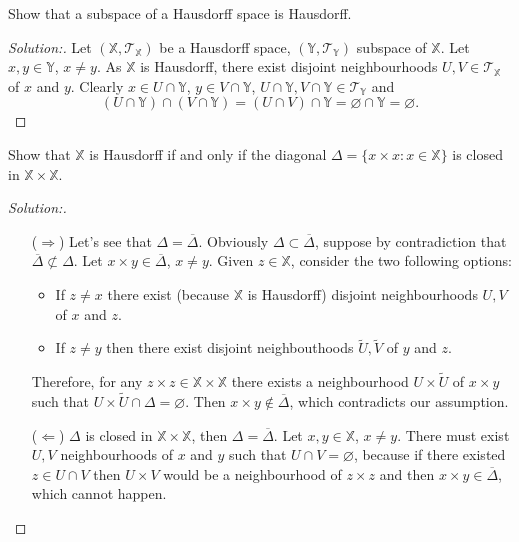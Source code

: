 \documentclass[a4paper,12pt, reqno]{article}
\theoremstyle{definition}
\newenvironment{exerr}[1]{
  \renewcommand\theexeralt{#1}
  \exeralt
}{\endexeralt}
\newenvironment{solution}{\begin{proof}[Solution:]}{\end{proof}}
\newcommand{\T}{\mathscr{T}}
\newcommand{\X}{\mathbb{X}}
\newcommand{\Y}{\mathbb{Y}}
\begin{document}
\begin{exerr}{12}
  Show that a subspace of a Hausdorff space is Hausdorff.
\end{exerr}
\begin{solution}
  Let $(\X,\T_{\X})$ be a Hausdorff space, $(\Y,\T_{\Y})$ subspace of $\X$. Let $x,y\in\Y$, $x\neq y$. As $\X$ is Hausdorff, there exist disjoint neighbourhoods $U,V\in\T_{\X}$ of $x$ and $y$. Clearly $x\in U\cap\Y$, $y\in V\cap\Y$, $U\cap\Y, V\cap\Y\in\T_{\Y}$ and
  \begin{equation*}
    (U\cap\Y)\cap (V\cap\Y) = (U\cap V)\cap \Y = \varnothing\cap\Y = \varnothing.
  \end{equation*}
\end{solution}

\begin{exerr}{13}
  Show that $\X$ is Hausdorff if and only if the diagonal $\Delta = \{ x\times x : x\in\X \}$ is closed in $\X\times\X$.
\end{exerr}
\begin{solution}\hfill
  \begin{itemize}
    \item[($\Longrightarrow$)] Let's see that $\Delta = \overline{\Delta}$. Obviously $\Delta\subset \overline{\Delta}$, suppose by contradiction that $\overline{\Delta}\not\subset\Delta$. Let $x\times y\in\overline{\Delta}$, $x\neq y$. Given $z\in\X$, consider the two following options:
      \begin{itemize}
        \item If $z\neq x$ there exist (because $\X$ is Hausdorff) disjoint neighbourhoods $U,V$ of $x$ and $z$.
        \item If $z\neq y$ then there exist disjoint neighbouthoods $\widetilde{U},\widetilde{V}$ of $y$ and $z$.
      \end{itemize}
      Therefore, for any $z\times z\in\X\times\X$ there exists a neighbourhood $U\times \widetilde{U}$ of $x\times y$ such that $U\times \widetilde{U}\cap\Delta = \varnothing$. Then $x\times y\notin \overline{\Delta}$, which contradicts our assumption.
    \item[($\Longleftarrow$)] $\Delta$ is closed in $\X\times\X$, then $\Delta = \overline{\Delta}$. Let $x,y\in\X$, $x\neq y$. There must exist $U,V$ neighbourhoods of $x$ and $y$ such that $U\cap V = \varnothing$, because if there existed $z\in U\cap V$ then $U\times V$ would be a neighbourhood of $z\times z$ and then $x\times y\in\overline{\Delta}$, which cannot happen.
  \end{itemize}
\end{solution}
\end{document}
